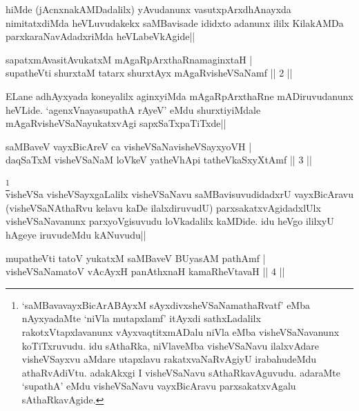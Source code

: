 \begin{artha}
hiMde (jAcnxnakAMDadalilx) yAvudanunx vasutxpArxdhAnayxda 
nimitatxdiMda heVLuvudakekx saMBavisade ididxto adanunx ililx 
KilakAMDa parxkaraNavAdadxriMda heVLabeVkAgide||
\end{artha}

\begin{shl}
sapatxmAvasitAvukatxM mAgaRpArxthaRnamaginxtaH | \\
supatheVti shurxtaM tatarx shurxtAyx mAgaRvisheVSaNamf \hfill|| 2 || 
\end{shl}

\begin{artha}
ELane adhAyxyada koneyalilx aginxyiMda mAgaRpArxthaRne mADiruvudanunx 
heVLide. `agenxVnayasupathA rAyeV' eMdu shurxtiyiMdale 
mAgaRvisheVSaNayukatxvAgi sapxSaTxpaTiTxde||
\end{artha}


\begin{shl}
saMBaveV vayxBicAreV ca visheVSaNavisheVSayxyoVH | \\
daqSaTxM visheVSaNaM loVkeV yatheVhApi tatheVkaSxyXtAmf \hfill|| 3 || 
\end{shl}

\begin{artha}
\footnote[1]{`saMBavavayxBicArABAyxM sAyxdivxsheVSaNamathaRvatf' eMba 
nAyxyadaMte `niVla mutapxlamf' itAyxdi sathxLadalilx 
rakotxVtapxlavanunx vAyxvaqtitxmADalu niVla eMba visheVSaNavanunx 
koTiTxruvudu. idu sAthaRka, niVlaveMba visheVSaNavu ilalxvAdare 
visheVSayxvu aMdare utapxlavu rakatxvaNaRvAgiyU irabahudeMdu 
athaRvAdiVtu. adakAkxgi I visheVSaNavu sAthaRkavAguvudu. adaraMte 
`supathA' eMdu visheVSaNavu vayxBicAravu parxsakatxvAgalu 
sAthaRkavAgide.}\\
visheVSa visheVSayxgaLalilx visheVSaNavu saMBavisuvudidadxrU 
vayxBicAravu (visheVSaNAthaRvu kelavu kaDe ilalxdiruvudU) 
parxsakatxvAgidadxlUlx visheVSaNavanunx parxyoVgisuvudu loVkadalilx 
kaMDide. idu heVgo ililxyU hAgeye iruvudeMdu kANuvudu||
\end{artha}


\begin{shl}
mupatheVti tatoV yukatxM saMBaveV BUyasAM pathAmf | \\
visheVSaNamatoV vAcAyxH panAthxnaH kamaRheVtavaH \hfill|| 4 || 
\end{shl}


